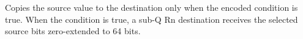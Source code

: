 Copies the source value to the destination only when the encoded condition is true. When the condition is true, a sub-Q Rn destination receives the selected source bits zero-extended to 64 bits.
